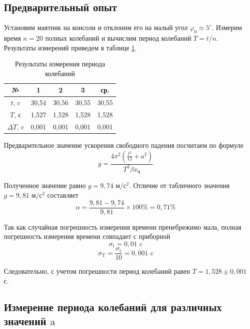 	\subsection{Предварительный опыт}
	Установим маятник на консоли и отклоним его на малый угол $\varphi_0 \approx 5^\circ$. Измерим время $n = 20$ полных колебаний и вычислим период колебаний $T = t/n$. Результаты измерений приведем в таблице \ref{tab1}.
	\begin{table}[H]
		\begin{center}
			\begin{tabular}{|c|c|c|c|c|}
				\hline
				№ & 1 & 2 & 3 & ср. \\
				\hline
				$t$, c & 30,54 & 30,56 & 30,55 & 30,55 \\ 
				\hline
				$T$, с & 1,527 & 1,528 & 1,528 & 1,528\\ 
				\hline
				$\Delta T$, c& 0,001 & 0,001 & 0,001 & 0,001 \\
				\hline
			\end{tabular}
		\end{center}
		\caption{Результаты измерения периода колебаний}
		\label{tab1}
	\end{table}
	
	Предварительное значение ускорения свободного падения посчитаем по формуле
	\begin{equation}\label{golos}
		g = \frac{4\pi^2 (\frac{l^2}{12} + a^2)}{T^2 \beta x_\text{ц}}
	\end{equation}
	\par Полученное значение равно $g = 9,74$ м/с$^2$. Отличие от табличного значения $g = 9,81$ м/с$^2$ составляет 
	\begin{equation}
		\alpha = \frac{9,81 - 9,74}{9,81}\times100\% = 0,71\%
	\end{equation}
	
	\par Так как случайная погрешность измерения времени пренебрежимо мала, полная погрешность измерения времени совпадает с приборной
		$$\sigma_\text{t} =  0,01\text{ c}$$
		$$\sigma_\text{T} = \frac{\sigma_\text{t}}{10} = 0,001\text{ c}$$
	\par Следовательно, с учетом погрешности период колебаний равен $T = 1,528 \pm 0,001$ с.
	
	\subsection{Измерение периода колебаний для различных значений $\text{a}$}
	
